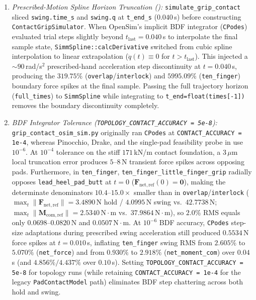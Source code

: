 \documentclass[11pt,a4paper]{article}
\begin{document}
\begin{enumerate}[leftmargin=*,noitemsep]
\item \textit{Prescribed-Motion Spline Horizon Truncation ():} \texttt{simulate\_grip\_contact} sliced \texttt{swing.time\_s} and \texttt{swing.q} at \texttt{t\_end\_s} ($0.040$\,s) before constructing \texttt{ContactGripSimulator}. When OpenSim's implicit BDF integrator (\texttt{CPodes}) evaluated trial steps slightly beyond $t_{\mathrm{last}} = 0.040$\,s to interpolate the final sample state, \texttt{SimmSpline::calcDerivative} switched from cubic spline interpolation to linear extrapolation ($\ddot{q}(t) \equiv 0$ for $t > t_{\mathrm{last}}$). This injected a $\sim 90$\,rad/s$^2$ prescribed-hand acceleration step discontinuity at $t = 0.040$\,s, producing the $319.75\%$ (\texttt{overlap}/\texttt{interlock}) and $5995.09\%$ (\texttt{ten\_finger}) boundary force spikes at the final sample. Passing the full trajectory horizon (\texttt{full\_times}) to \texttt{SimmSpline} while integrating to \texttt{t\_end=float(times[-1])} removes the boundary discontinuity completely.
\item \textit{BDF Integrator Tolerance (\texttt{TOPOLOGY\_CONTACT\_ACCURACY = 5e-8}):} \texttt{grip\_contact\_osim\_sim.py} originally ran \texttt{CPodes} at \texttt{CONTACT\_ACCURACY = 1e-4}, whereas Pinocchio, Drake, and the single-pad feasibility probe in  use $10^{-6}$. At $10^{-4}$ tolerance on the stiff $171$\,kN/m contact foundation, a $3\,\mu\mathrm{m}$ local truncation error produces $5\text{--}8$\,N transient force spikes across opposing pads. Furthermore, in \texttt{ten\_finger}, \texttt{ten\_finger\_little\_finger\_grip} radially opposes \texttt{lead\_heel\_pad\_butt} at $t = 0$ ($\mathbf{F}_{\mathrm{net,ref}}(0) = \mathbf{0}$), making the determinate denominators $10.4\text{--}15.0\times$ smaller than in \texttt{overlap}/\texttt{interlock} ($\max_t\|\mathbf{F}_{\mathrm{net,ref}}\| = 3.4890$\,N hold / $4.0995$\,N swing vs.\ $42.7738$\,N; $\max_t\|\mathbf{M}_{\mathrm{com,ref}}\| = 2.5340\,\mathrm{N\cdot m}$ vs.\ $37.9864\,\mathrm{N\cdot m}$), so $2.0\%$ RMS equals only $0.0698\text{--}0.0820$\,N and $0.0507\,\mathrm{N\cdot m}$. At $10^{-6}$ BDF accuracy, \texttt{CPodes} step-size adaptations during prescribed swing acceleration still produced $0.5534$\,N force spikes at $t = 0.010$\,s, inflating \texttt{ten\_finger} swing RMS from $2.605\%$ to $5.070\%$ (\texttt{net\_force}) and from $0.930\%$ to $2.918\%$ (\texttt{net\_moment\_com}) over $0.04$\,s (and $4.856\% / 4.437\%$ over $0.10$\,s). Setting \texttt{TOPOLOGY\_CONTACT\_ACCURACY = 5e-8} for topology runs (while retaining \texttt{CONTACT\_ACCURACY = 1e-4} for the legacy \texttt{PadContactModel} path) eliminates BDF step chattering across both hold and swing.

\end{enumerate}
\end{document}
